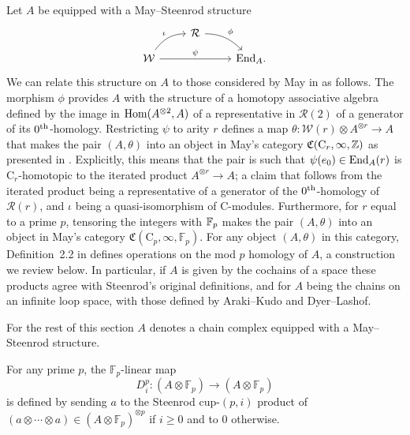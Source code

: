 Let $A$ be equipped with a May--Steenrod structure
\begin{equation*}
\begin{tikzcd}[column sep = normal, row sep = small]
& \mathcal R \arrow[dr, "\phi", out=0] & \\
\mathcal W \arrow[ur, "\iota", out=55, in=180] \arrow[rr, "\psi"] & & \End_A.
\end{tikzcd}
\end{equation*}
We can relate this structure on $A$ to those considered by May in \cite{may1970general} as follows.
The morphism $\phi$ provides $A$ with the structure of a homotopy associative algebra defined by the image in $\mathrm{Hom}(A^{\otimes 2}, A)$ of a representative in $\mathcal R(2)$ of a generator of its $0^{\mathrm{th}}$-homology.
Restricting $\psi$ to arity $r$ defines a map $\theta \colon \mathcal W(r) \otimes A^{\otimes r} \to A$ that makes the pair $(A, \theta)$ into an object in May's category $\mathfrak{C}(\mathrm C_r, \infty, \mathbb{Z})$ as presented in \cite[Definitions 2.1]{may1970general}.
Explicitly, this means that the pair is such that $\psi(e_0) \in \mathrm{End}_A(r)$ is $\mathrm C_r$-homotopic to the iterated product $A^{\otimes r} \to A$; a claim that follows from the iterated product being a representative of a generator of the $0^{\mathrm{th}}$-homology of $\mathcal R(r)$, and $\iota$ being a quasi-isomorphism of $\mathrm C$-modules.
Furthermore, for $r$ equal to a prime $p$, tensoring the integers with ${\mathbb{F}_p}$ makes the pair $(A, \theta)$ into an object in May's category $\mathfrak{C}(\mathrm C_p, \infty, \mathbb{F}_p)$.
For any object $(A, \theta)$ in this category, Definition~2.2 in \cite{may1970general} defines operations on the mod $p$ homology of $A$, a construction we review below.
In particular, if $A$ is given by the cochains of a space these products agree with Steenrod's original definitions, and for $A$ being the chains on an infinite loop space, with those defined by Araki--Kudo and Dyer--Lashof.

For the rest of this section $A$ denotes a chain complex equipped with a May--Steenrod structure.

\begin{definition}
	For any prime $p$, the $\mathbb{F}_p$-linear map
	\begin{equation*}
	D^p_i \colon (A \otimes \mathbb{F}_p) \to (A \otimes \mathbb{F}_p)
	\end{equation*}
	is defined by sending $a$ to the Steenrod cup-$(p, i)$ product of $(a \otimes \cdots \otimes a) \in (A \otimes \mathbb{F}_p)^{\otimes p}$ if $i \geq 0$ and to $0$ otherwise.
\end{definition}

